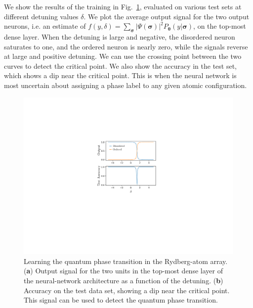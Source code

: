 \documentclass[twocolumn,english,reprint,superscriptaddress,longbibliography,pra]{revtex4-1}
\begin{document}
We show the results of the training in Fig.~\ref{Fig::supervised}, evaluated on various test sets at different detuning values $\delta$. We plot the average output signal for the two output neurons, i.e. an estimate of $f(y,\delta) = \sum_{\bm \sigma} |\Psi(\bm{\sigma})|^2 P_{\bm{\theta}}(y|\bm{\sigma})$, on the top-most dense layer. When the detuning is large and negative, the disordered neuron saturates to one, and the ordered neuron is nearly zero, while the signals reverse at large and positive detuning. We can use the crossing point between the two curves to detect the critical point. We also show the accuracy in the test set, which shows a dip near the critical point. This is when the neural network is most uncertain about assigning a phase label to any given atomic configuration.


\begin{figure}[t]
\noindent \centering{}\includegraphics[width=\columnwidth]{fig_supervised}
\caption{Learning the quantum phase transition in the Rydberg-atom array. ({\bf a}) Output signal for the two units in the top-most dense layer of the neural-network architecture as a function of the detuning. ({\bf b}) Accuracy on the test data set, showing a dip near the critical point. This signal can be used to detect the quantum phase transition.}
\label{Fig::supervised} 
\end{figure}


\end{document}
